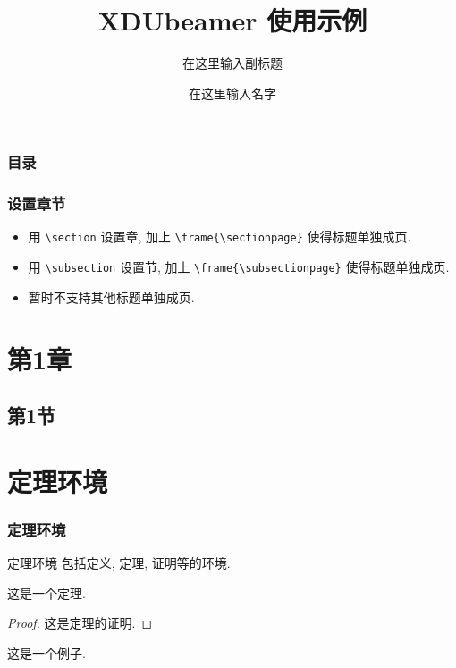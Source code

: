 \documentclass{ctexbeamer}
\title{XDUbeamer 使用示例}
\subtitle{在这里输入副标题}
\institute{在这里输入学院}
\author{在这里输入名字}
\begin{document}
\begin{frame}[plain] %
    \titlepage
\end{frame}
\begin{frame}
    \frametitle{目录}
    \tableofcontents
\end{frame}
\begin{frame}[fragile] %
    \frametitle{设置章节}
    \begin{itemize}
        \item 用 \verb|\section| 设置章, 加上 \verb|\frame{\sectionpage}| 使得标题单独成页.
        \item 用 \verb|\subsection| 设置节, 加上 \verb|\frame{\subsectionpage}| 使得标题单独成页.
        \item 暂时不支持其他标题单独成页.
    \end{itemize}
\end{frame}
\section{第1章}
\frame{\sectionpage}
\subsection{第1节}
\frame{\subsectionpage}
\section{定理环境}
\begin{frame}
    \frametitle{定理环境}
    \begin{definition}
        \alert{定理环境} 包括定义, 定理, 证明等的环境.
    \end{definition}\pause %
    \begin{theorem}
        这是一个定理.
    \end{theorem}\pause
    \begin{proof}
        这是定理的证明.
    \end{proof}\pause
    \begin{example}
        这是一个例子.
    \end{example}
\end{frame}
\end{document}
